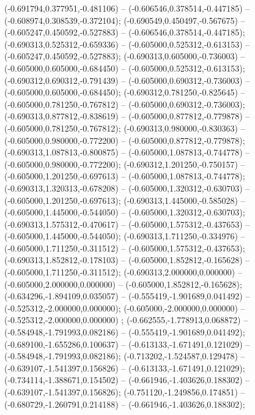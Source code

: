  (-0.691794,0.377951,-0.481106) -- (-0.606546,0.378514,-0.447185) -- (-0.608974,0.308539,-0.372104);
 (-0.690549,0.450497,-0.567675) -- (-0.605247,0.450592,-0.527883) -- (-0.606546,0.378514,-0.447185);
 (-0.690313,0.525312,-0.659336) -- (-0.605000,0.525312,-0.613153) -- (-0.605247,0.450592,-0.527883);
 (-0.690313,0.605000,-0.736003) -- (-0.605000,0.605000,-0.684450) -- (-0.605000,0.525312,-0.613153);
 (-0.690312,0.690312,-0.791439) -- (-0.605000,0.690312,-0.736003) -- (-0.605000,0.605000,-0.684450);
 (-0.690312,0.781250,-0.825645) -- (-0.605000,0.781250,-0.767812) -- (-0.605000,0.690312,-0.736003);
 (-0.690313,0.877812,-0.838619) -- (-0.605000,0.877812,-0.779878) -- (-0.605000,0.781250,-0.767812);
 (-0.690313,0.980000,-0.830363) -- (-0.605000,0.980000,-0.772200) -- (-0.605000,0.877812,-0.779878);
 (-0.690313,1.087813,-0.800875) -- (-0.605000,1.087813,-0.744778) -- (-0.605000,0.980000,-0.772200);
 (-0.690312,1.201250,-0.750157) -- (-0.605000,1.201250,-0.697613) -- (-0.605000,1.087813,-0.744778);
 (-0.690313,1.320313,-0.678208) -- (-0.605000,1.320312,-0.630703) -- (-0.605000,1.201250,-0.697613);
 (-0.690313,1.445000,-0.585028) -- (-0.605000,1.445000,-0.544050) -- (-0.605000,1.320312,-0.630703);
 (-0.690313,1.575312,-0.470617) -- (-0.605000,1.575312,-0.437653) -- (-0.605000,1.445000,-0.544050);
 (-0.690313,1.711250,-0.334976) -- (-0.605000,1.711250,-0.311512) -- (-0.605000,1.575312,-0.437653);
 (-0.690313,1.852812,-0.178103) -- (-0.605000,1.852812,-0.165628) -- (-0.605000,1.711250,-0.311512);
 (-0.690313,2.000000,0.000000) -- (-0.605000,2.000000,0.000000) -- (-0.605000,1.852812,-0.165628);
 (-0.634296,-1.894109,0.035057) -- (-0.555419,-1.901689,0.041492) -- (-0.525312,-2.000000,0.000000);
 (-0.605000,-2.000000,0.000000) -- (-0.525312,-2.000000,0.000000) ;
 (-0.662555,-1.778913,0.068872) -- (-0.584948,-1.791993,0.082186) -- (-0.555419,-1.901689,0.041492);
 (-0.689100,-1.655286,0.100637) -- (-0.613133,-1.671491,0.121029) -- (-0.584948,-1.791993,0.082186);
 (-0.713202,-1.524587,0.129478) -- (-0.639107,-1.541397,0.156826) -- (-0.613133,-1.671491,0.121029);
 (-0.734114,-1.388671,0.154502) -- (-0.661946,-1.403626,0.188302) -- (-0.639107,-1.541397,0.156826);
 (-0.751120,-1.249856,0.174851) -- (-0.680729,-1.260791,0.214188) -- (-0.661946,-1.403626,0.188302);
